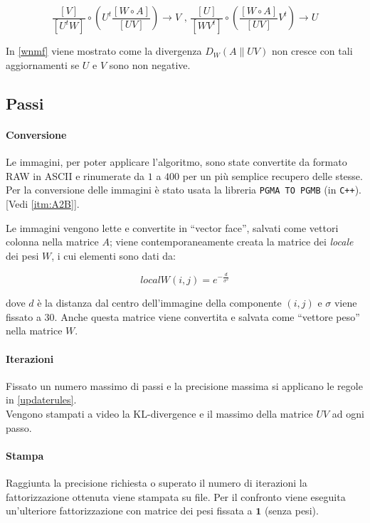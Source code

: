 \documentclass[a4paper]{article} %
\begin{document}
\[ \frac{[V]}{[U^tW]} \circ \left( U^t \frac{[W \circ A]}{[UV]} \right) \rightarrow V \text{ , } \frac{[U]}{[WV^t]} \circ \left( \frac{[W \circ A]}{[UV]}V^t \right) \rightarrow U \]

In \ref{wnmf} viene mostrato come la divergenza $D_W(A\lVert UV)$ non cresce con tali aggiornamenti se $U$ e $V$ sono non negative.

\subsection{Passi}
\paragraph{Conversione}\label{subsec:conversione}
Le immagini, per poter applicare l'algoritmo, sono state convertite da formato RAW in ASCII e rinumerate da $1$ a $400$ per un più semplice recupero delle stesse. Per la conversione delle immagini è stato usata la libreria \texttt{PGMA TO PGMB} (in \texttt{C++}).
[Vedi \ref{itm:A2B}].

Le immagini vengono lette e convertite in ``vector face'', salvati come vettori colonna nella matrice $A$; viene contemporaneamente creata la matrice dei \emph{locale} dei pesi $W$, i cui elementi sono dati da:

\[ localW(i,j) = e^{-\frac{d}{\sigma^2}} \]

dove $d$ è la distanza dal centro dell'immagine della componente $(i,j)$ e $\sigma$ viene fissato a $30$.
Anche questa matrice viene convertita e salvata come ``vettore peso'' nella matrice $W$.

\paragraph{Iterazioni}
Fissato un numero massimo di passi e la precisione massima si applicano le regole in \ref{updaterules}.\\
Vengono stampati a video la KL-divergence e il massimo della matrice $UV$ ad ogni passo.

\paragraph{Stampa}
Raggiunta la precisione richiesta o superato il numero di iterazioni la fattorizzazione ottenuta viene stampata su file.
Per il confronto viene eseguita un'ulteriore fattorizzazione con matrice dei pesi fissata a $\textbf{1}$ (senza pesi).
\end{document}
